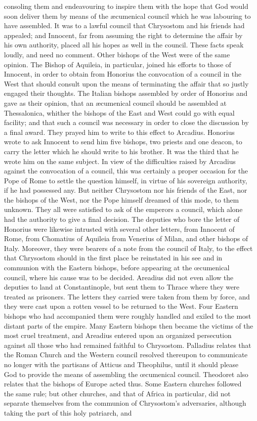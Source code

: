 consoling them and endeavouring to inspire them with the hope that God would soon deliver them by means of the æcumenical council which he was labouring to have assembled. It was to a lawful council that Chrysostom and his friends had appealed; and Innocent, far from assuming the right to determine the affair by his own authority, placed all his hopes as well in the council. These facts speak loudly, and need no comment. Other bishops of the West were of the same opinion. The Bishop of Aquileia, in particular, joined his efforts to those of Innocent, in order to obtain from Honorius the convocation of a council in the West that should consult upon the means of terminating the affair that so justly engaged their thoughts. The Italian bishops assembled by order of Honorius and gave as their opinion, that an æcumenical council should be assembled at Thessalonica, whither the bishops of the East and West could go with equal facility; and that such a council was necessary in order to close the discussion by a final award. They prayed him to write to this effect to Arcadius. Honorius wrote to ask Innocent to send him five bishops, two priests and one deacon, to carry the letter which he should write to his brother. It was the third that he wrote him on the same subject. In view of the difficulties raised by Arcadius against the convocation of a council, this was certainly a proper occasion for the Pope of Rome to settle the question himself, in virtue of his sovereign authority, if he had possessed any. But neither Chrysostom nor his friends of the East, nor the bishops of the West, nor the Pope himself dreamed of this mode, to them unknown. They all were satisfied to ask of the emperors a council, which alone had the authority to give a final decision. The deputies who bore the letter of Honorius were likewise intrusted with several other letters, from Innocent of Rome, from Chomatius of Aquileia from Venerius of Milan, and other bishops of Italy. Moreover, they were bearers of a note from the council of Italy, to the effect that Chrysostom should in the first place be reinstated in his see and in communion with the Eastern bishops, before appearing at the œcumenical council, where his cause was to be decided. Areadius did not even allow the deputies to land at Constantinople, but sent them to Thrace where they were treated as prisoners. The letters they carried were taken from them by force, and they were cast upon a rotten vessel to be returned to the West. Four Eastern bishops who had accompanied them were roughly handled and exiled to the most distant parts of the empire. Many Eastern bishops then became the victims of the most cruel treatment, and Areadius entered upon an organized persecution against all those who had remained faithful to Chrysostom. Palladius relates that the Roman Church and the Western council resolved thereupon to communicate no longer with the partisans of Atticus and Theophilus, until it should please God to provide the means of assembling the œcumenical council. Theodoret also relates that the bishops of Europe acted thus. Some Eastern churches followed the same rule; but other churches, and that of Africa in particular, did not separate themselves from the communion of Chrysostom’s adversaries, although taking the part of this holy patriarch, and 